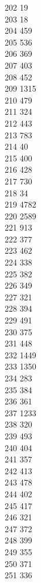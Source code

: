 { 202	19 \\
 203	18 \\
 204	459 \\
 205	536 \\
 206	369 \\
 207	403 \\
 208	452 \\
 209	1315 \\
 210	479 \\
 211	324 \\
 212	443 \\
 213	783 \\
 214	40 \\
 215	400 \\
 216	428 \\
 217	730 \\
 218	34 \\
 219	4782 \\
 220	2589 \\
 221	913 \\
 222	377 \\
 223	462 \\
 224	338 \\
 225	382 \\
 226	349 \\
 227	321 \\
 228	394 \\
 229	491 \\
 230	375 \\
 231	448 \\
 232	1449 \\
 233	1350 \\
 234	283 \\
 235	384 \\
 236	361 \\
 237	1233 \\
 238	320 \\
 239	493 \\
 240	404 \\
 241	357 \\
 242	413 \\
 243	478 \\
 244	402 \\
 245	417 \\
 246	321 \\
 247	372 \\
 248	399 \\
 249	355 \\
 250	371 \\
 251	336 \\
}
